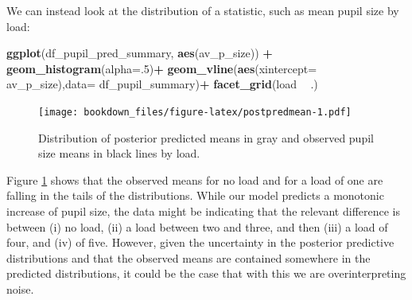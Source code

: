 \documentclass[12pt,]{krantz}
\newenvironment{Shaded}{\begin{snugshade}}{\end{snugshade}}
\newcommand{\KeywordTok}[1]{\textcolor[rgb]{0.13,0.29,0.53}{\textbf{#1}}}
\newcommand{\DataTypeTok}[1]{\textcolor[rgb]{0.13,0.29,0.53}{#1}}
\newcommand{\DecValTok}[1]{\textcolor[rgb]{0.00,0.00,0.81}{#1}}
\newcommand{\StringTok}[1]{\textcolor[rgb]{0.31,0.60,0.02}{#1}}
\newcommand{\CommentTok}[1]{\textcolor[rgb]{0.56,0.35,0.01}{\textit{#1}}}
\newcommand{\OperatorTok}[1]{\textcolor[rgb]{0.81,0.36,0.00}{\textbf{#1}}}
\newcommand{\NormalTok}[1]{#1}
\theoremstyle{definition}
\theoremstyle{definition}
\theoremstyle{definition}
\theoremstyle{remark}
\begin{document}
We can instead look at the distribution of a statistic, such as mean
pupil size by load:

\begin{Shaded}
\end{Shaded}




\begin{Shaded}
\begin{Highlighting}[]
\KeywordTok{ggplot}\NormalTok{(df_pupil_pred_summary, }\KeywordTok{aes}\NormalTok{(av_p_size)) }\OperatorTok{+}
\StringTok{    }\KeywordTok{geom_histogram}\NormalTok{(}\DataTypeTok{alpha=}\NormalTok{.}\DecValTok{5}\NormalTok{)}\OperatorTok{+}
\StringTok{    }\KeywordTok{geom_vline}\NormalTok{(}\KeywordTok{aes}\NormalTok{(}\DataTypeTok{xintercept=}\NormalTok{ av_p_size),}\DataTypeTok{data=}\NormalTok{ df_pupil_summary)}\OperatorTok{+}
\StringTok{    }\KeywordTok{facet_grid}\NormalTok{(load }\OperatorTok{~}\StringTok{ }\NormalTok{.)}
\end{Highlighting}
\end{Shaded}

\begin{figure}
\centering
\texttt{[image: bookdown\_files/figure-latex/postpredmean-1.pdf]}
\caption{\label{fig:postpredmean}Distribution of posterior predicted means in gray and
observed pupil size means in black lines by load.}
\end{figure}

Figure \ref{fig:postpredmean} shows that the observed means for no load
and for a load of one are falling in the tails of the distributions.
While our model predicts a monotonic increase of pupil size, the data
might be indicating that the relevant difference is between (i) no load,
(ii) a load between two and three, and then (iii) a load of four, and
(iv) of five. However, given the uncertainty in the posterior predictive
distributions and that the observed means are contained somewhere in the
predicted distributions, it could be the case that with this we are
overinterpreting noise.
\end{document}
